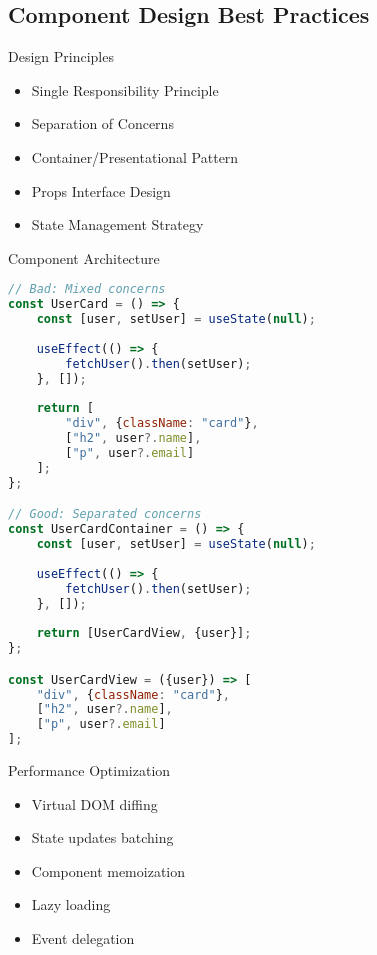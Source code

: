 \subsection{Component Design Best Practices}

\begin{theorem}{Design Principles}
    \begin{itemize}
        \item Single Responsibility Principle
        \item Separation of Concerns
        \item Container/Presentational Pattern
        \item Props Interface Design
        \item State Management Strategy
    \end{itemize}
\end{theorem}

\begin{KR}{Component Architecture}
\begin{lstlisting}[language=JavaScript, style=basesmol]
// Bad: Mixed concerns
const UserCard = () => {
    const [user, setUser] = useState(null);
    
    useEffect(() => {
        fetchUser().then(setUser);
    }, []);
    
    return [
        "div", {className: "card"},
        ["h2", user?.name],
        ["p", user?.email]
    ];
};

// Good: Separated concerns
const UserCardContainer = () => {
    const [user, setUser] = useState(null);
    
    useEffect(() => {
        fetchUser().then(setUser);
    }, []);
    
    return [UserCardView, {user}];
};

const UserCardView = ({user}) => [
    "div", {className: "card"},
    ["h2", user?.name],
    ["p", user?.email]
];
\end{lstlisting}
\end{KR}

\begin{concept}{Performance Optimization}
    \begin{itemize}
        \item Virtual DOM diffing
        \item State updates batching
        \item Component memoization
        \item Lazy loading
        \item Event delegation
    \end{itemize}
\end{concept}

